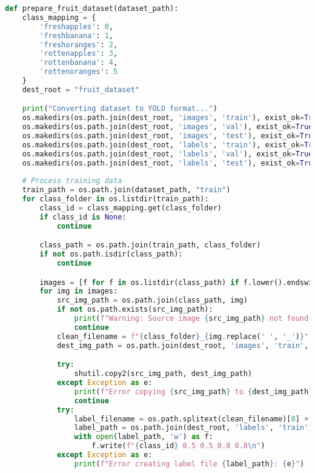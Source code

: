 \begin{lstlisting}[language=Python, caption={Fruit Dataset Preparation}, label={lst:fruit-dataset}]
def prepare_fruit_dataset(dataset_path):
    class_mapping = {
        'freshapples': 0,
        'freshbanana': 1,
        'freshoranges': 2,
        'rottenapples': 3,
        'rottenbanana': 4,
        'rottenoranges': 5
    }
    dest_root = "fruit_dataset"

    print("Converting dataset to YOLO format...")
    os.makedirs(os.path.join(dest_root, 'images', 'train'), exist_ok=True)
    os.makedirs(os.path.join(dest_root, 'images', 'val'), exist_ok=True)
    os.makedirs(os.path.join(dest_root, 'images', 'test'), exist_ok=True)
    os.makedirs(os.path.join(dest_root, 'labels', 'train'), exist_ok=True)
    os.makedirs(os.path.join(dest_root, 'labels', 'val'), exist_ok=True)
    os.makedirs(os.path.join(dest_root, 'labels', 'test'), exist_ok=True)
    
    # Process training data
    train_path = os.path.join(dataset_path, "train")
    for class_folder in os.listdir(train_path):
        class_id = class_mapping.get(class_folder)
        if class_id is None:
            continue

        class_path = os.path.join(train_path, class_folder)
        if not os.path.isdir(class_path):
            continue

        images = [f for f in os.listdir(class_path) if f.lower().endswith(('.png', '.jpg', '.jpeg'))]
        for img in images:
            src_img_path = os.path.join(class_path, img)
            if not os.path.exists(src_img_path):
                print(f"Warning: Source image {src_img_path} not found, skipping.")
                continue
            clean_filename = f"{class_folder}_{img.replace(' ', '_')}"
            dest_img_path = os.path.join(dest_root, 'images', 'train', clean_filename)

            try:
                shutil.copy2(src_img_path, dest_img_path)
            except Exception as e:
                print(f"Error copying {src_img_path} to {dest_img_path}: {e}")
                continue
            try:
                label_filename = os.path.splitext(clean_filename)[0] + '.txt'
                label_path = os.path.join(dest_root, 'labels', 'train', label_filename)
                with open(label_path, 'w') as f:
                    f.write(f"{class_id} 0.5 0.5 0.8 0.8\n")
            except Exception as e:
                print(f"Error creating label file {label_path}: {e}")
    

\end{lstlisting}
